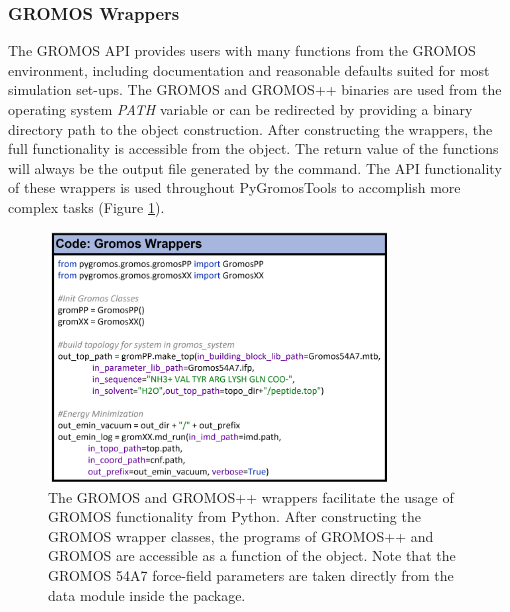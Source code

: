 \subsubsection{GROMOS Wrappers}
The GROMOS API provides users with many functions from the GROMOS environment, including documentation and reasonable defaults suited for most simulation set-ups. The GROMOS and GROMOS++ binaries are used from the operating system \textit{PATH} variable or can be redirected by providing a binary directory path to the object construction. After constructing the wrappers, the full functionality is accessible from the object. The return value of the functions will always be the output file generated by the command. The API functionality of these wrappers is used throughout PyGromosTools to accomplish more complex tasks (Figure \ref{fig: GROMOSWrappers}).

\begin{figure}[h]
    \centering
    \includegraphics[width=0.8\textwidth]{fig/ApplicationExamples/codeExample_GROMOSWrapper.png}
    \caption{The GROMOS and GROMOS++ wrappers facilitate the usage of GROMOS functionality from Python. After constructing the GROMOS wrapper classes, the programs of GROMOS++ and GROMOS are accessible as a function of the object. Note that the GROMOS 54A7 force-field parameters are taken directly from the data module inside the package.}
    \label{fig: GROMOSWrappers}
\end{figure}


\FloatBarrier